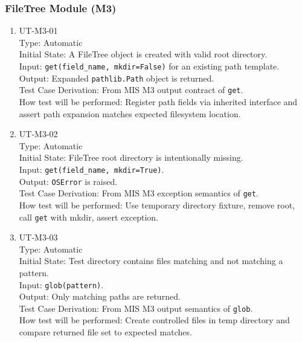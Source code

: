 \documentclass[12pt, titlepage]{article}
\begin{document}
\subsubsection{FileTree Module (M3)}

\begin{enumerate}

\item{UT-M3-01\\}
    Type: Automatic \\
    Initial State: A FileTree object is created with valid root directory. \\
    Input: \lstinline|get(field_name, mkdir=False)| for an existing path template. \\
    Output: Expanded \lstinline|pathlib.Path| object is returned. \\
    Test Case Derivation: From MIS M3 output contract of \lstinline|get|. \\
    How test will be performed: Register path fields via inherited interface and assert path expansion matches expected filesystem location.

\item{UT-M3-02\\}
    Type: Automatic \\
    Initial State: FileTree root directory is intentionally missing. \\
    Input: \lstinline|get(field_name, mkdir=True)|. \\
    Output: \lstinline|OSError| is raised. \\
    Test Case Derivation: From MIS M3 exception semantics of \lstinline|get|. \\
    How test will be performed: Use temporary directory fixture, remove root, call \lstinline|get| with mkdir, assert exception.

\item{UT-M3-03\\}
    Type: Automatic \\
    Initial State: Test directory contains files matching and not matching a pattern. \\
    Input: \lstinline|glob(pattern)|. \\
    Output: Only matching paths are returned. \\
    Test Case Derivation: From MIS M3 output semantics of \lstinline|glob|. \\
    How test will be performed: Create controlled files in temp directory and compare returned file set to expected matches.

\end{enumerate}
\end{document}
